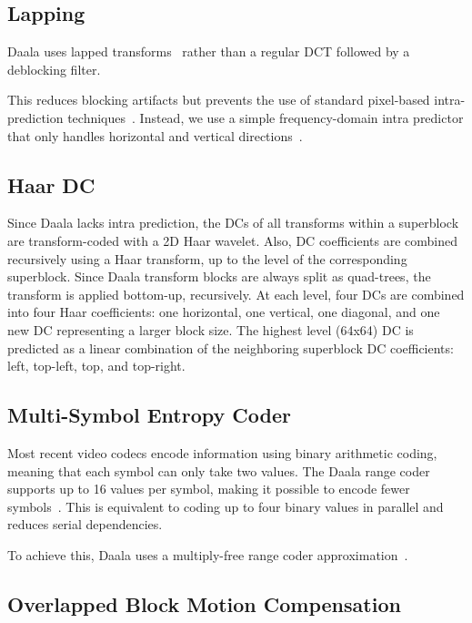 \documentclass[english,conference,10pt]{IEEEtran}
\begin{document}
\subsection{Lapping}

Daala uses lapped transforms~\cite{MalvarS89,Tran2003} rather than
a regular DCT followed by a deblocking filter. 

This reduces blocking artifacts but prevents the use of standard pixel-based
intra-prediction techniques~\cite{DaedeDCC}. Instead, we use a simple
frequency-domain intra predictor that only handles horizontal and
vertical directions~\cite{EggePCS}. 


\subsection{Haar DC}

Since Daala lacks intra prediction, the DCs of all transforms within a superblock
are transform-coded with a 2D Haar wavelet.
Also, DC coefficients are combined recursively using a Haar transform,
up to the level of the corresponding superblock. Since Daala transform blocks
are always split as quad-trees, the transform is applied bottom-up, recursively.
At each level, four DCs are combined into four Haar coefficients: one horizontal,
one vertical, one diagonal, and one new DC representing a larger block size.
The highest level (64x64) DC is predicted as a linear combination of the 
neighboring superblock DC coefficients: left, top-left, top, and top-right.

\subsection{Multi-Symbol Entropy Coder}

Most recent video codecs encode information using binary arithmetic
coding, meaning that each symbol can only take two values. The Daala
range coder supports up to 16 values per symbol, making it possible
to encode fewer symbols~\cite{derfTools}. This is equivalent to
coding up to four binary values in parallel and reduces serial dependencies. 

To achieve this, Daala uses a multiply-free range coder approximation~\cite{stuiver1998piecewise}. 


\subsection{Overlapped Block Motion Compensation}
\end{document}
